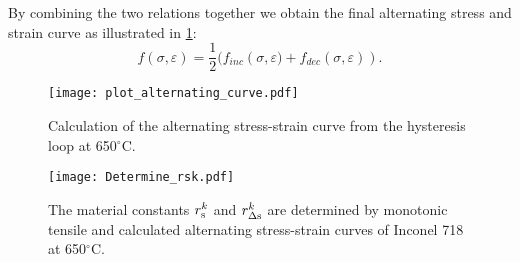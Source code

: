 By combining the two relations together we obtain the final alternating stress and strain curve as illustrated in \ref{Fig:Alternating_Curve}:
\begin{equation}
f(\sigma,\varepsilon)=\frac{1}{2}(f_{inc}\left(\sigma,\varepsilon)+f_{dec}(\sigma,\varepsilon)\right).
\end{equation}
\begin{figure}[!htp]
\centering
\texttt{[image: plot\_alternating\_curve.pdf]}
\caption{Calculation of the alternating stress-strain curve from the hysteresis loop at 650$^{\circ}$C.}
\label{Fig:Alternating_Curve}
\end{figure}
\begin{figure}[!htp]
\centering
\texttt{[image: Determine\_rsk.pdf]}
\caption{The material constants $r_{\rm{s}}^k$ and $r_{\Delta \rm{s}}^k$ are determined by monotonic tensile and calculated alternating stress-strain curves of Inconel 718 at 650$^{\circ}$C.}
\label{Fig:Determine_rsk}
\end{figure}


